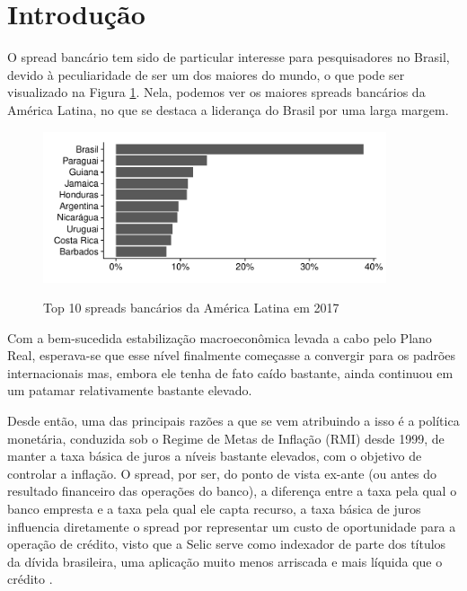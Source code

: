\documentclass[a4paper, article, 12pt, openany, oneside, english, brazil]{abntex2}
\numberwithin{equation}{section}
\begin{document}
\imprimircapa
\imprimirfolhaderosto


\tableofcontents*
\clearpage

\textual

\pagestyle{fancy}
\renewcommand{\headrulewidth}{0pt}

\section{Introdução}

    O spread bancário tem sido de particular interesse para pesquisadores no Brasil, devido à peculiaridade de ser um dos maiores do mundo, o que pode ser visualizado na Figura \ref{spreadal}. Nela, podemos ver os maiores spreads bancários da América Latina, no que se destaca a liderança do Brasil por uma larga margem.

\begin{figure}[h]
  \centering
    \caption{Top 10 spreads bancários da América Latina em 2017}
      \includegraphics[width = 0.9\textwidth, scale=1]{spread_AL.pdf}
      \label{spreadal}
\end{figure}
    
    Com a bem-sucedida estabilização macroeconômica levada a cabo pelo Plano Real, esperava-se que esse nível finalmente começasse a convergir para os padrões internacionais mas, embora ele tenha de fato caído bastante, ainda continuou em um patamar relativamente bastante elevado.

    Desde então, uma das principais razões a que se vem atribuindo a isso é a política monetária, conduzida sob o Regime de Metas de Inflação (RMI) desde 1999, de manter a taxa básica de juros a níveis bastante elevados, com o objetivo de controlar a inflação. O spread, por ser, do ponto de vista ex-ante (ou antes do resultado financeiro das operações do banco), a diferença entre a taxa pela qual o banco empresta e a taxa pela qual ele capta recurso, a taxa básica de juros influencia diretamente o spread por representar um custo de oportunidade para a operação de crédito, visto que a Selic serve como indexador de parte dos títulos da dívida brasileira, uma aplicação muito menos arriscada e mais líquida que o crédito \cite[p.~7]{manhica12}.
\end{document}
